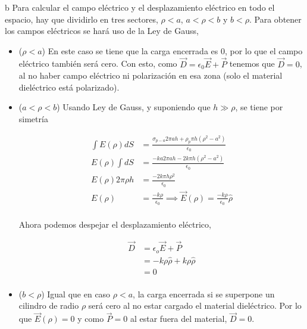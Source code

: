 \begin{solucion}{4}
\ics b Para calcular el campo eléctrico y el desplazamiento eléctrico en todo el espacio, hay que dividirlo en tres sectores, $\rho <a$,   $a<\rho <b$ y    $b<\rho$. Para obtener los campos eléctricos se hará uso de la Ley de Gauss,

    \begin{itemize}
    
    
    \item ($\rho < a$) En este caso se tiene que la carga encerrada es 0, por lo que el campo eléctrico también será cero. Con esto, como $\Vec{D} = \epsilon_0\Vec{E} + \Vec{P}$ tenemos que $\Vec{D} = 0$, al no haber campo eléctrico ni polarización en esa zona (solo el material dieléctrico está polarizado).
    
    \item ($a < \rho < b$) Usando Ley de Gauss, y suponiendo que $h \gg \rho$, se tiene por simetría
    
    \begin{equation}
\begin{split}
    \int E(\rho)dS &= \frac{\sigma_{p-a}2\pi a h + \rho_p\pi h(\rho^2 - a^2)}{\epsilon_0}\\
            E(\rho)\int dS &= \frac{-ka2\pi a h -2k\pi h(\rho^2 - a^2)}{\epsilon_0}\\
            E(\rho)2\pi \rho h &= \frac{-2k\pi h\rho^2}{\epsilon_0}\\
            E(\rho) &= \frac{-k\rho}{\epsilon_0} \implies \Vec E(\rho) = \frac{-k\rho}{\epsilon_0}\hat{\rho}\\
\end{split}
\nonumber
\end{equation}
    
    Ahora podemos despejar el desplazamiento eléctrico,
    
    \begin{equation}
        \begin{split}
            \Vec{D} &= \epsilon_o\Vec{E} + \Vec{P}\\
            &= -k\rho \hat\rho + k\rho\hat\rho\\
            &= 0\\
        \end{split}
        \nonumber
    \end{equation}
    
    \item ($b < \rho$) Igual que en caso $\rho < a$, la carga encerrada si se superpone un cilindro de radio $\rho$ será cero al no estar cargado el material dieléctrico. Por lo que $\Vec{E}(\rho) = 0$ y como $\Vec{P} = 0$ al estar fuera del material, $\Vec{D} = 0$.
    

\end{itemize}
\end{solucion}
